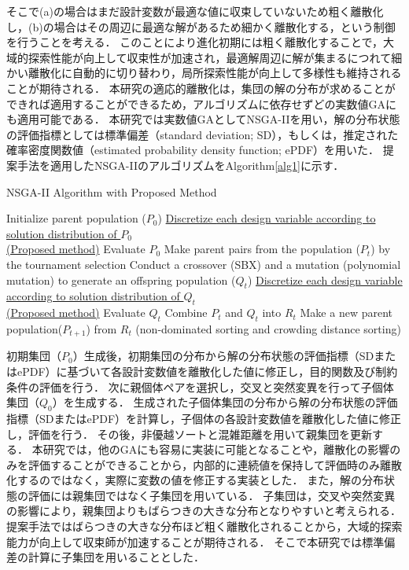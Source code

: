 \documentclass[../main/main]{subfiles}
\begin{document}
そこで(a)の場合はまだ設計変数が最適な値に収束していないため粗く離散化し，(b)の場合はその周辺に最適な解があるため細かく離散化する，という制御を行うことを考える．
このことにより進化初期には粗く離散化することで，大域的探索性能が向上して収束性が加速され，最適解周辺に解が集まるにつれて細かい離散化に自動的に切り替わり，局所探索性能が向上して多様性も維持されることが期待される．
本研究の適応的離散化は，集団の解の分布が求めることができれば適用することができるため，アルゴリズムに依存せずどの実数値GAにも適用可能である．
本研究では実数値GAとしてNSGA-IIを用い，解の分布状態の評価指標としては標準偏差（standard deviation; SD），もしくは，推定された確率密度関数値（estimated probability density function; ePDF）を用いた．
提案手法を適用したNSGA-IIのアルゴリズムをAlgorithm\ref{alg1}に示す．

\vspace{-0.1in}
\begin{algorithm}[t]         
\caption{NSGA-II Algorithm with Proposed Method}         
\label{alg1}                          
\begin{algorithmic}[1]             
\STATE Initialize parent population ($P_0$)
\STATE \underline{Discretize {\rm each} design variable according to solution distribution of $P_0$}\\\underline{ (Proposed method)}
\STATE Evaluate $P_0$
\STATE Make parent pairs from the population ($P_t$) by the tournament selection
\STATE Conduct a crossover (SBX) and a mutation (polynomial mutation) to generate an offspring population ($Q_t$)
\STATE \underline{Discretize each design variable according to solution distribution of $Q_t$}\\ \underline{ (Proposed method)}
\STATE Evaluate $Q_t$
\STATE Combine $P_t$ and $Q_t$ into $R_t$
\STATE Make a new parent population($P_{t+1}$) from $R_t$ (non-dominated sorting and crowding distance sorting)
\ENDFOR
\end{algorithmic}
\end{algorithm}

初期集団（$P_0$）生成後，初期集団の分布から解の分布状態の評価指標（SDまたはePDF）に基づいて各設計変数値を離散化した値に修正し，目的関数及び制約条件の評価を行う．
次に親個体ペアを選択し，交叉と突然変異を行って子個体集団（$Q_0$）を生成する．
生成された子個体集団の分布から解の分布状態の評価指標（SDまたはePDF）を計算し，子個体の各設計変数値を離散化した値に修正し，評価を行う．
その後，非優越ソートと混雑距離を用いて親集団を更新する．
本研究では，他のGAにも容易に実装に可能となることや，離散化の影響のみを評価することができることから，内部的に連続値を保持して評価時のみ離散化するのではなく，実際に変数の値を修正する実装とした．
また，解の分布状態の評価には親集団ではなく子集団を用いている．
子集団は，交叉や突然変異の影響により，親集団よりもばらつきの大きな分布となりやすいと考えられる．
提案手法ではばらつきの大きな分布ほど粗く離散化されることから，大域的探索能力が向上して収束師が加速することが期待される．
そこで本研究では標準偏差の計算に子集団を用いることとした．
\end{document}
